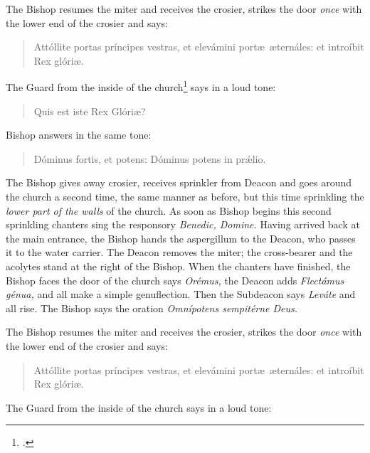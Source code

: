 \documentclass[letterpaper]{report}
\begin{document}
{    \rubric The Bishop resumes the miter and receives the crosier, strikes the
    door \textit{once} with the lower end of the crosier and says:

    \begin{quote}
        Attóllite portas príncipes vestras, et elevámini port\ae\ \ae ternáles: et
        introíbit Rex glóri\ae.
    \end{quote}

    The Guard from the inside of the church\footcite[The door may be slightly
    open, so that the bishop and the deacon of the church can hear each
    other.][note 1, p. 46.]{consecranda} says in a loud tone:

    \begin{quote}
       Quis est iste Rex Glóri\ae? 
    \end{quote}

    Bishop answers in the same tone:

    \begin{quote}
        Dóminus fortis, et potens: Dóminus potens in pr\'\ae lio.
    \end{quote}

    \rubric The Bishop gives away crosier, receives sprinkler from Deacon and
    goes around the church a second time, the same manner as before, but this
    time sprinkling the \textit{lower part of the walls} of the church. As soon
    as Bishop begins this second sprinkling chanters sing the responsory
    \textit{Benedic, Domine.} Having arrived back at the main entrance, the
    Bishop hands the aspergillum to the Deacon, who passes it to the water
    carrier. The Deacon removes the miter; the cross-bearer and the acolytes
    stand at the right of the Bishop. When the chanters have finished, the
    Bishop faces the door of the church says \textit{Orémus,} the Deacon adds
    \textit{Flectámus génua,} and all make a simple genuflection. Then the
    Subdeacon says \textit{Leváte} and all rise. The Bishop says the oration
    \textit{Omnípotens sempitérne Deus.}

    \rubric The Bishop resumes the miter and receives the crosier, strikes the
    door \textit{once} with the lower end of the crosier and says:

    \begin{quote}
        Attóllite portas príncipes vestras, et elevámini port\ae\ \ae ternáles:
        et introíbit Rex glóri\ae.
    \end{quote}

    The Guard from the inside of the church says in a loud tone:

}
\end{document}
